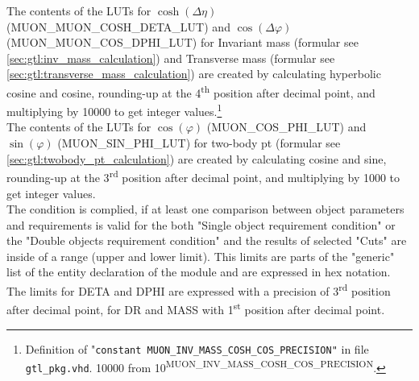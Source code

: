 The contents of the LUTs for $\cosh(\Delta\eta)$ (\small{MUON\_MUON\_COSH\_DETA\_LUT}\normalsize) and $\cos(\Delta\varphi)$ (\small{MUON\_MUON\_COS\_DPHI\_LUT}\normalsize) for Invariant mass
(formular see \ref{sec:gtl:inv_mass_calculation}) and Transverse mass (formular see \ref{sec:gtl:transverse_mass_calculation}) are created by calculating hyperbolic cosine and cosine, 
rounding-up at the 4\textsuperscript{th} position after decimal point,
and multiplying by 10000 to get integer values.\footnote{Definition of "\texttt{constant \small{MUON\_INV\_MASS\_COSH\_COS\_PRECISION}\normalsize"} in file \texttt{gtl\_pkg.vhd}.
10000 from 10\textsuperscript{\tiny{MUON\_INV\_MASS\_COSH\_COS\_PRECISION}}\normalsize.}\\
The contents of the LUTs for $\cos(\varphi)$ (\small{MUON\_COS\_PHI\_LUT}\normalsize) and $\sin(\varphi)$ (\small{MUON\_SIN\_PHI\_LUT}\normalsize) for two-body pt 
(formular see \ref{sec:gtl:twobody_pt_calculation}) are created by calculating cosine and sine, rounding-up at the 3\textsuperscript{rd} position after decimal point,
and multiplying by 1000 to get integer values.\\
The condition is complied, if at least one comparison between object parameters and requirements is valid for the both "Single object requirement condition" or the "Double objects requirement condition"
and the results of selected "Cuts" are inside of a range (upper and lower limit).
This limits are parts of the "generic" list of the entity declaration of the module and are expressed in hex notation. The limits for DETA and DPHI
are expressed with a precision of 3\textsuperscript{rd} position after decimal point, for DR and MASS with 1\textsuperscript{st} position after decimal point.

